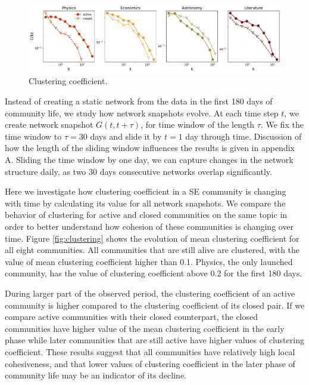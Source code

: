 \begin{figure}[h]
	\centering
	\includegraphics[width=\linewidth]{figures/stackexchange/clustering_fullnet.pdf}
	\caption{Clustering coefficient.}
	\label{fig:fullclustering}
\end{figure}

Instead of creating a static network from the data in the first 180 days of community life, we study how network snapshots evolve. At each time step $t$, we create network snapshot $G(t, t+\tau)$, for time window of the length $\tau$. We fix the time window to $\tau=30$ days and slide it by $t=1$ day through time. Discussion of how the length of the sliding window influences the results is given in appendix A. Sliding the time window by one day, we can capture changes in the network structure daily, as two 30 days consecutive networks overlap significantly. 

Here we investigate how clustering coefficient in a SE community is changing with time by calculating its value for all network snapshots. We compare the behavior of clustering for active and closed communities on the same topic in order to better understand how cohesion of these communities is changing over time. Figure \ref{fig:clustering} shows the evolution of mean clustering coefficient for all eight communities. All communities that are still alive are clustered, with the value of mean clustering coefficient higher than 0.1. Physics, the only launched community, has the value of clustering coefficient above 0.2 for the first 180 days.

During larger part of the observed period, the clustering coefficient of an active community is higher compared to the clustering coefficient of its closed pair. If we compare active communities with their closed counterpart, the closed communities have higher value of the mean clustering coefficient in the early phase while later communities that are still active have higher values of clustering coefficient. These results suggest that all communities have relatively high local cohesiveness, and that lower values of clustering coefficient in the later phase of community life may be an indicator of its decline. 

